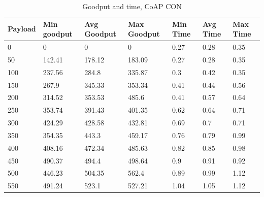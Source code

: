 \begin{table}[H]
\scriptsize
\centering
\caption{Goodput and time, CoAP CON}
\label{goodputTimeCON}
\begin{tabular}{|l|l|l|l|l|l|l|}
\hline
\textbf{Payload} & \textbf{Min goodput} & \textbf{Avg Goodput} & \textbf{Max Goodput} & \textbf{Min Time} & \textbf{Avg Time} & \textbf{Max Time} \\ \hline
0                & 0                    & 0                    & 0                    & 0.27              & 0.28              & 0.35              \\ \hline
50               & 142.41               & 178.12               & 183.09               & 0.27              & 0.28              & 0.35              \\ \hline
100              & 237.56               & 284.8                & 335.87               & 0.3               & 0.42              & 0.35              \\ \hline
150              & 267.9                & 345.33               & 353.34               & 0.41              & 0.44              & 0.56              \\ \hline
200              & 314.52               & 353.53               & 485.6                & 0.41              & 0.57              & 0.64              \\ \hline
250              & 353.74               & 391.43               & 401.35               & 0.62              & 0.64              & 0.71              \\ \hline
300              & 424.29               & 428.58               & 432.81               & 0.69              & 0.7               & 0.71              \\ \hline
350              & 354.35               & 443.3                & 459.17               & 0.76              & 0.79              & 0.99              \\ \hline
400              & 408.16               & 472.34               & 485.63               & 0.82              & 0.85              & 0.98              \\ \hline
450              & 490.37               & 494.4                & 498.64               & 0.9               & 0.91              & 0.92              \\ \hline
500              & 446.23               & 504.35               & 562.4                & 0.89              & 0.99              & 1.12              \\ \hline
550              & 491.24               & 523.1                & 527.21               & 1.04              & 1.05              & 1.12              \\ \hline

\end{tabular}
\end{table}
